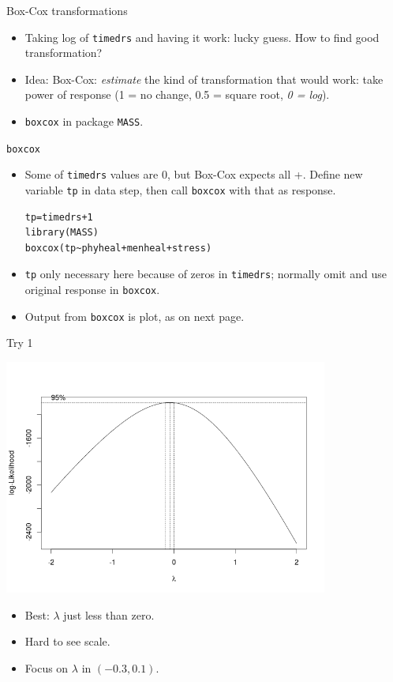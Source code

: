 \begin{frame}[fragile]{Box-Cox transformations}


  \begin{itemize}
  \item Taking log of \verb-timedrs- and having it work: lucky
    guess. How to find good transformation?
  \item Idea: Box-Cox: {\em estimate} the kind of transformation that
    would work: take power of response (1 = no change, 0.5 = square
    root, {\em 0 = log}).
  \item \texttt{boxcox} in package \texttt{MASS}.
  \end{itemize}

\end{frame}

\begin{frame}[fragile]{\texttt{boxcox}}
  \begin{itemize}
  \item Some of \verb-timedrs- values are 0, but Box-Cox expects all
    +. Define new variable \verb-tp- in data step, then call
    \verb-boxcox- with that as response.

\begin{verbatim}
tp=timedrs+1
library(MASS)
boxcox(tp~phyheal+menheal+stress)
\end{verbatim}


  \item \verb-tp- only necessary here because of zeros in
    \verb-timedrs-; normally omit and use original response in
    \verb-boxcox-.
  \item Output from \texttt{boxcox} is plot, as on next page.

\end{itemize}

\end{frame}

\begin{frame}[fragile]{Try 1}

\includegraphics[width=0.8\textwidth]{boxcox}
\begin{itemize}
\item Best: $\lambda$ just less than zero.
\item Hard to see scale. 
\item Focus on $\lambda$ in $(-0.3,0.1)$.

\end{itemize}

\end{frame}


